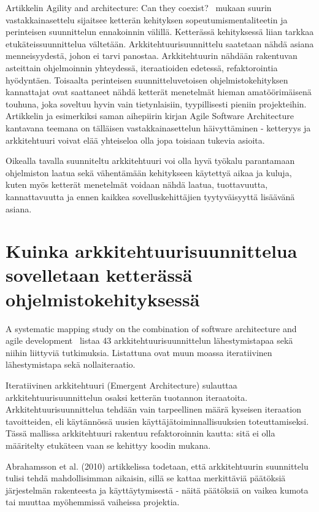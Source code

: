 Artikkelin Agility and architecture: Can they coexist?~\citep{abrahamsson2010agility} mukaan suurin vastakkainasettelu sijaitsee ketterän kehityksen sopeutumismentaliteetin ja perinteisen suunnittelun ennakoinnin välillä. Ketterässä kehityksessä liian tarkkaa etukäteissuunnittelua vältetään. Arkkitehtuurisuunnittelu saatetaan nähdä asiana menneisyydestä, johon ei tarvi panostaa. Arkkitehtuurin nähdään rakentuvan asteittain ohjelmoinnin yhteydessä, iteraatioiden edetessä, refaktorointia hyödyntäen. Toisaalta perinteisen suunnitteluvetoisen ohjelmistokehityksen kannattajat ovat saattaneet nähdä ketterät menetelmät hieman amatöörimäisenä touhuna, joka soveltuu hyvin vain tietynlaisiin, tyypillisesti pieniin projekteihin. Artikkelin ja esimerkiksi saman aihepiirin kirjan Agile Software Architecture~\citep{babar2013agile} kantavana teemana on tälläisen vastakkainasettelun häivyttäminen - ketteryys ja arkkitehtuuri voivat elää yhteiseloa olla jopa toisiaan tukevia asioita.

Oikealla tavalla suunniteltu arkkitehtuuri voi olla hyvä työkalu parantamaan ohjelmiston laatua sekä vähentämään kehitykseen käytettyä aikaa ja kuluja, kuten myös ketterät menetelmät voidaan nähdä laatua, tuottavuutta, kannattavuutta ja ennen kaikkea sovelluskehittäjien tyytyväisyyttä lisäävänä asiana.~\citep{abrahamsson2010agility, babar2013agile}

\section*{Kuinka arkkitehtuurisuunnittelua sovelletaan ketterässä ohjelmistokehityksessä}
\thispagestyle{empty}

A systematic mapping study on the combination of software architecture and agile development~\citep{yang2016systematic} listaa 43 arkkitehtuurisuunnittelun lähestymistapaa sekä niihin liittyviä tutkimuksia. Listattuna ovat muun moassa iteratiivinen lähestymistapa sekä nollaiteraatio.

Iteratiivinen arkkitehtuuri (Emergent Architecture) sulauttaa arkkitehtuurisuunnittelun osaksi ketterän tuotannon iteraatoita. Arkkitehtuurisuunnittelua tehdään vain tarpeellinen määrä kyseisen iteraation tavoitteiden, eli käytännössä uusien käyttäjätoiminnallisuuksien toteuttamiseksi. Tässä mallissa arkkitehtuuri rakentuu refaktoroinnin kautta: sitä ei olla määritelty etukäteen vaan se kehittyy koodin mukana.~\citep{abrahamsson2010agility, babar2013agile}

Abrahamsson et al. (2010) artikkelissa todetaan, että arkkitehtuurin suunnittelu tulisi tehdä mahdollisimman aikaisin, sillä se kattaa merkittäviä päätöksiä järjestelmän rakenteesta ja käyttäytymisestä - näitä päätöksiä on vaikea kumota tai muuttaa myöhemmissä vaiheissa projektia.

